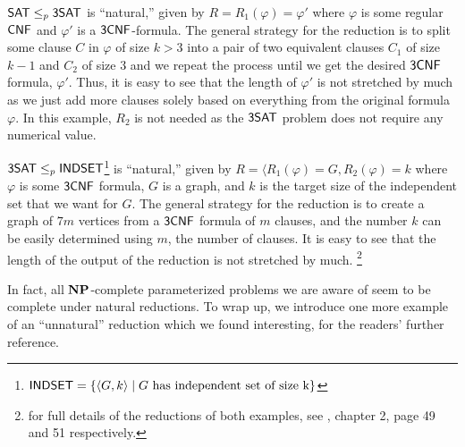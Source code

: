 \documentclass[11pt]{article}
\begin{document}
\begin{example}
	$\mathsf{SAT} \leq_p \mathsf{3SAT}$ is ``natural,'' given by $R = R_1(\varphi) = \varphi'$ where $\varphi$ is some regular $\mathsf{CNF}$ and $\varphi'$ is a $\mathsf{3CNF}$-formula. The general strategy for the reduction is to split some clause $C$ in $\varphi$ of size $k > 3$ into a pair of two equivalent clauses $C_1$ of size $k - 1$ and $C_2$ of size $3$ and we repeat the process until we get the desired $\mathsf{3CNF}$ formula, $\varphi'$. Thus, it is easy to see that the length of $\varphi'$ is not stretched by much as we just add more clauses solely based on everything from the original formula $\varphi$. In this example, $R_2$ is not needed as the $\mathsf{3SAT}$ problem does not require any numerical value.
\end{example}

\begin{example}
	$\mathsf{3SAT} \leq_p \mathsf{INDSET}$\footnote{$\mathsf{INDSET} = \{ \langle G, k \rangle \mid G \text{ has independent set of size k}\}$} is ``natural,'' given by $R = \langle R_1(\varphi) = G, R_2(\varphi) = k$ where $\varphi$ is some $\mathsf{3CNF}$ formula, $G$ is a graph, and $k$ is the target size of the independent set that we want for $G$. The general strategy for the reduction is to create a graph of $7m$ vertices from a $\mathsf{3CNF}$ formula of $m$ clauses, and the number $k$ can be easily determined using $m$, the number of clauses. It is easy to see that the length of the output of the reduction is not stretched by much. \footnote{for full details of the reductions of both examples, see \cite{arora2009}, chapter 2, page 49 and 51 respectively.}
\end{example}
	
In fact, all $\mathbf{NP}$-complete parameterized problems we are aware of seem to be complete under natural reductions. To wrap up, we introduce one more example of an ``unnatural'' reduction which we found interesting, for the readers' further reference.
\end{document}
